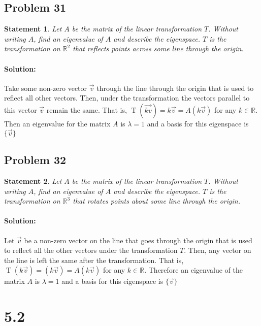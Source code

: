 \documentclass[12pt, letterpaper]{article}
\newcommand{\R}{\mathbb{R}}
\theoremstyle{statement}
\theoremstyle{statement}
\newtheorem*{atmStat}{Statement}
\newenvironment{Solution}{\noindent\ignorespaces\paragraph{Solution:}}{\hfill \ding{122}\par\noindent}
\begin{document}
    \subsection*{Problem 31}
    \begin{atmStat}
    Let $A$ be the matrix of the linear transformation $T$. Without writing $A$, find an eigenvalue of $A$ and describe the eigenspace.
    $T$ is the transformation on $\R^2$ that reflects points across some line through the origin.
    \end{atmStat}
    \begin{Solution}
    Take some non-zero vector $\vec{v}$ through the line through the origin that is used to reflect all other vectors. Then, under the transformation the vectors parallel to this vector $\vec{v}$ remain the same. That is, $\operatorname{T}(\vec{kv})=k\vec{v}=A(k\vec{v})$ for any $k\in\R$. Then an eigenvalue for the matrix $A$ is $\lambda=1$ and a basis for this eigenspace is $\{\vec{v}\}$
    \end{Solution}
    
    \subsection*{Problem 32}
    \begin{atmStat}
    Let $A$ be the matrix of the linear transformation $T$. Without writing $A$, find an eigenvalue of $A$ and describe the eigenspace.
    $T$ is the transformation on $\R^3$ that rotates points about some line through the origin.
    \end{atmStat}
    \begin{Solution}
    Let $\vec{v}$ be a non-zero vector on the line that goes through the origin that is used to reflect all the other vectors under the transformation $T$. Then, any vector on the line is left the same after the transformation. That is, $\operatorname{T}(k\vec{v})=(k\vec{v})=A(k\vec{v})$ for any $k\in\R$. Therefore an eigenvalue of the matrix $A$ is $\lambda=1$ and a basis for this eigenspace is $\{\vec{v}\}$
    \end{Solution}
    
    \section*{5.2}
\end{document}
